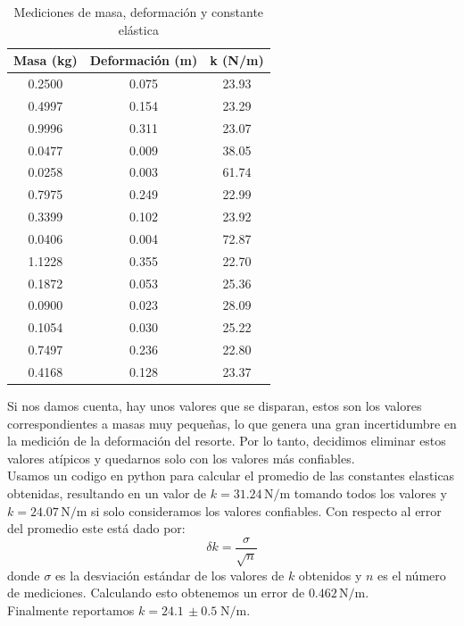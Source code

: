 \documentclass{article}
\begin{document}
\begin{table}[H]
\centering
\begin{tabular}{|c|c|c|}
\hline
Masa (kg) & Deformación (m) & k (N/m) \\
\hline
0.2500 & 0.075 & 23.93 \\
\hline
0.4997 & 0.154 & 23.29 \\
\hline
0.9996 & 0.311 & 23.07 \\
\hline
0.0477 & 0.009 & 38.05 \\
\hline
0.0258 & 0.003 & 61.74 \\
\hline
0.7975 & 0.249 & 22.99 \\
\hline
0.3399 & 0.102 & 23.92 \\
\hline
0.0406 & 0.004 & 72.87 \\
\hline
1.1228 & 0.355 & 22.70 \\
\hline
0.1872 & 0.053 & 25.36 \\
\hline
0.0900 & 0.023 & 28.09 \\
\hline
0.1054 & 0.030 & 25.22 \\
\hline
0.7497 & 0.236 & 22.80 \\
\hline
0.4168 & 0.128 & 23.37 \\
\hline
\end{tabular}
\caption{Mediciones de masa, deformación y constante elástica}
\label{tab:mediciones-resorte}
\end{table}

Si nos damos cuenta, hay unos valores que se disparan, estos son los
valores correspondientes a masas muy pequeñas, lo que genera una gran
incertidumbre en la medición de la deformación del resorte. Por lo tanto,
decidimos eliminar estos valores atípicos y quedarnos solo con los valores
más confiables. \\

Usamos un codigo en python para calcular el promedio de las constantes 
elasticas obtenidas, resultando en un valor de $k = 31.24 \, \text{N/m}$
tomando todos los valores y $k = 24.07 \, \text{N/m}$ si solo consideramos
los valores confiables. Con respecto al error del promedio este está dado
por:
\begin{equation}
   \delta k = \dfrac{\sigma}{\sqrt{n}}
\end{equation}
donde $\sigma$ es la desviación estándar de los valores de $k$ obtenidos
y $n$ es el número de mediciones. Calculando esto obtenemos un error de
$0.462 \, \text{N/m}$. \\

Finalmente reportamos $k = 24.1 \, \pm 0.5 \; \text{N/m}$. \\
\end{document}
